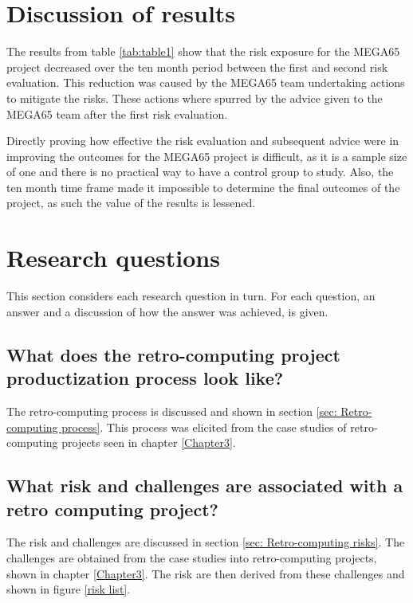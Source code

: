\section{Discussion of results}
The results from table \ref{tab:table1} show that the risk exposure for the MEGA65 project decreased over the ten month period between the first and second risk evaluation. This reduction was caused by the MEGA65 team undertaking actions to mitigate the risks. These actions where spurred by the advice given to the MEGA65 team after the first risk evaluation. 

Directly proving how effective the risk evaluation and subsequent advice were in improving the outcomes for the MEGA65 project is difficult, as it is a sample size of one and there is no practical way to have a control group to study. Also, the ten month time frame made it impossible to determine the final outcomes of the project, as such the value of the results is lessened.

\section{Research questions}
This section considers each research question in turn. For each question, an answer and a discussion of how the answer was achieved, is given.

\subsection{What does the retro-computing project productization process look like?}
The retro-computing process is discussed and shown in section \ref{sec: Retro-computing process}. This process was elicited from the case studies of retro-computing projects seen in chapter \ref{Chapter3}. 

\subsection{What risk and challenges are associated with a retro computing project?}
The risk and challenges are discussed in section \ref{sec: Retro-computing risks}. The challenges are obtained from the case studies into retro-computing projects, shown in chapter \ref{Chapter3}. The risk are then derived from these challenges and shown in figure \ref{risk list}.

